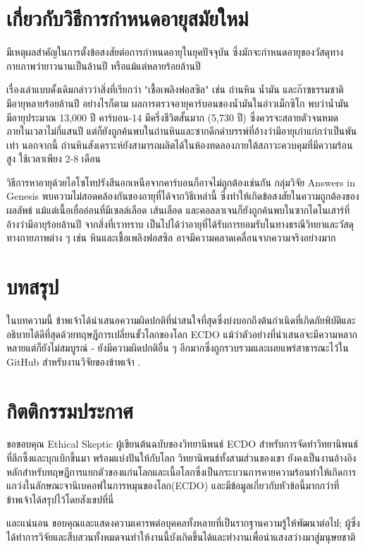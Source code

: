 \documentclass[10pt,twocolumn,letterpaper]{article}
\begin{document}
\section{เกี่ยวกับวิธีการกำหนดอายุสมัยใหม่}

มีเหตุผลสำคัญในการตั้งข้อสงสัยต่อการกำหนดอายุในยุคปัจจุบัน ซึ่งมักจะกำหนดอายุของวัสดุทางกายภาพว่ายาวนานเป็นล้านปี หรือแม้แต่หลายร้อยล้านปี

เรื่องเล่าแบบดั้งเดิมกล่าวว่าสิ่งที่เรียกว่า "เชื้อเพลิงฟอสซิล" เช่น ถ่านหิน น้ำมัน และก๊าซธรรมชาติ มีอายุหลายร้อยล้านปี \cite{104} อย่างไรก็ตาม ผลการตรวจอายุคาร์บอนของน้ำมันในอ่าวเม็กซิโก พบว่าน้ำมันมีอายุประมาณ 13,000 ปี \cite{105} คาร์บอน-14 มีครึ่งชีวิตสั้นมาก (5,730 ปี) ซึ่งควรจะสลายตัวจนหมดภายในเวลาไม่กี่แสนปี แต่ก็ยังถูกค้นพบในถ่านหินและซากดึกดำบรรพ์ที่อ้างว่ามีอายุเก่าแก่กว่าเป็นพันเท่า \cite{106} นอกจากนี้ ถ่านหินสังเคราะห์ยังสามารถผลิตได้ในห้องทดลองภายใต้สภาวะควบคุมที่มีความร้อนสูง ใช้เวลาเพียง 2-8 เดือน \cite{107}

วิธีการหาอายุด้วยไอโซโทปรังสีนอกเหนือจากคาร์บอนก็อาจไม่ถูกต้องเช่นกัน กลุ่มวิจัย Answers in Genesis พบความไม่สอดคล้องกันของอายุที่ได้จากวิธีเหล่านี้ ซึ่งทำให้เกิดข้อสงสัยในความถูกต้องของผลลัพธ์ \cite{108} แม้แต่เนื้อเยื่ออ่อนที่มีเซลล์เลือด เส้นเลือด และคอลลาเจนก็ยังถูกค้นพบในซากไดโนเสาร์ที่อ้างว่ามีอายุร้อยล้านปี \cite{109,110} จากสิ่งที่เราทราบ เป็นไปได้ว่าอายุที่ได้รับการยอมรับในทางธรณีวิทยาและวัสดุทางกายภาพต่าง ๆ เช่น หินและเชื้อเพลิงฟอสซิล อาจมีความคลาดเคลื่อนจากความจริงอย่างมาก

\section{บทสรุป}

ในบทความนี้ ข้าพเจ้าได้นำเสนอความผิดปกติที่น่าสนใจที่สุดซึ่งบ่งบอกถึงต้นกำเนิดที่เกิดภัยพิบัติและอธิบายได้ดีที่สุดด้วยทฤษฎีการเปลี่ยนขั้วโลกของโลก ECDO แม้ว่าตัวอย่างที่นำเสนอจะมีความหลากหลายแต่ก็ยังไม่สมบูรณ์ - ยังมีความผิดปกติอื่น ๆ อีกมากซึ่งถูกรวบรวมและเผยแพร่สาธารณะไว้ใน GitHub สำหรับงานวิจัยของข้าพเจ้า \cite{2}.

\section{กิตติกรรมประกาศ}

ขอขอบคุณ Ethical Skeptic ผู้เขียนต้นฉบับของวิทยานิพนธ์ ECDO สำหรับการจัดทำวิทยานิพนธ์ที่ลึกซึ้งและบุกเบิกขึ้นมา พร้อมแบ่งปันให้กับโลก วิทยานิพนธ์ทั้งสามส่วนของเขา \cite{1} ยังคงเป็นงานอ้างอิงหลักสำหรับทฤษฎีการแยกตัวของแก่นโลกและเนื้อโลกซึ่งเป็นกระบวนการคายความร้อนทำให้เกิดการแกว่งในลักษณะจานิเบคอฟในการหมุนของโลก(ECDO) และมีข้อมูลเกี่ยวกับหัวข้อนี้มากกว่าที่ข้าพเจ้าได้สรุปไว้โดยสังเขปที่นี่

และแน่นอน ขอบคุณและแสดงความเคารพต่อบุคคลทั้งหลายที่เป็นรากฐานความรู้ให้พัฒนาต่อไป; ผู้ซึ่งได้ทำการวิจัยและสืบสวนทั้งหมดจนทำให้งานนี้บังเกิดขึ้นได้และทำงานเพื่อนำแสงสว่างมาสู่มนุษยชาติ

\clearpage
\twocolumn

{\small
\renewcommand{\refname}{บรรณานุกรม}


}
\end{document}
